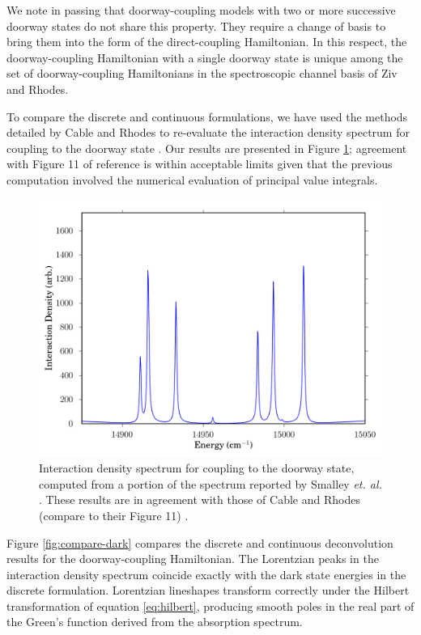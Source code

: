 We note in passing that doorway-coupling models with two or more
successive doorway states do not share this property.  They require a
change of basis to bring them into the %
form of the direct-coupling Hamiltonian.  In this respect, the
doorway-coupling Hamiltonian with a single doorway state is unique
among the set of doorway-coupling Hamiltonians in the spectroscopic
channel basis of Ziv and Rhodes.

To compare the discrete and continuous formulations, we have used the
methods detailed by Cable and Rhodes to re-evaluate the interaction
density spectrum for coupling to the doorway state \cite{cable80}.
Our results are presented in Figure \ref{fig:ids}; agreement with
Figure 11 of reference \cite{cable80} is within acceptable limits
given that the previous computation involved the numerical evaluation
of principal value integrals.

\begin{figure}
  \caption{Interaction density spectrum for coupling to the doorway
    state, computed from a portion of the  spectrum reported
    by Smalley \emph{et. al.}  \cite{smalley75}.  These results are in
    agreement with those of Cable and Rhodes 
    (compare to their Figure 11) \cite{cable80}. }
  \label{fig:ids}
  \centering
  \includegraphics[width=5in]{smalley-ids1.png}
\end{figure}

Figure \ref{fig:compare-dark} compares the discrete and continuous
deconvolution results for the doorway-coupling Hamiltonian.  The
Lorentzian peaks in the interaction density spectrum coincide exactly
with the dark state energies in the discrete formulation.  Lorentzian
lineshapes transform correctly under the Hilbert transformation of
equation \ref{eq:hilbert}, producing smooth poles in the real part of
the Green's function derived from the absorption spectrum.  

